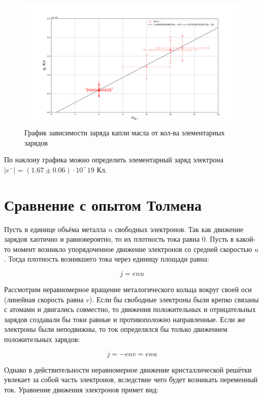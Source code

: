 \documentclass{lab}
\begin{document}
\begin{figure}[H]
	\centering
	\includegraphics[width=\textwidth]{graph.png}
	\caption{График зависимости заряда капли масла от кол-ва элементарных зарядов}
	\label{graph:q_n}
\end{figure}

По наклону графика можно определить элементарный заряд электрона $|e^{-}| = (1.67 \pm 0.06) \cdot 10^-19$ Кл.

\section{Сравнение с опытом Толмена}

Пусть в единице объёма металла $n$ свободных электронов. Так как движение зарядов хаотично и равновероятно, то их плотность тока равна 0. Пусть в какой-то момент возникло упорядоченное движение электронов со средней скоростью $u$. Тогда плотность возникшего тока через единицу площади равна:

\begin{equation}
	j = enu
\end{equation}

Рассмотрим неравномерное вращение металогического кольца вокруг своей оси (линейная скорость равна $v$). Если бы свободные электроны были крепко связаны с атомами и двигались совместно, то движения положительных и отрицательных зарядов создавали бы токи равные и противоположно направленные. Если же электроны были неподвижны, то ток определялся бы только движением положительных зарядов:

\begin{equation}
	j = -env = enu
\end{equation}

Однако в действительности неравномерное движение кристаллической решётки увлекает за собой часть электронов, вследствие чего будет возникать переменный ток.
Уравнение движения электронов примет вид:
\end{document}

